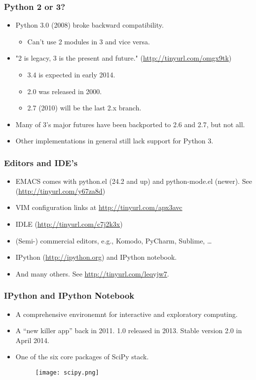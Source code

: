 \documentclass{beamer}
\begin{document}
\begin{frame}[fragile]
\frametitle{Python 2 or 3?}
\begin{itemize}

\item Python 3.0 (2008) broke backward compatibility.
\begin{itemize}
\item Can't use 2 modules in 3 and vice versa.
\end{itemize}

\item "2 is legacy, 3 is the
       present and future." (\url{http://tinyurl.com/omgx9tk})
\begin{itemize}
\item 3.4 is expected in early 2014.
\item 2.0 was released in 2000.
\item 2.7 (2010) will be the last 2.x branch.
\end{itemize}

\item Many of 3's major futures have been backported to 2.6 and 2.7, 
      but not all. 
\item Other implementations in general still
      lack support for Python 3.
\end{itemize}
\end{frame}

\begin{frame}[fragile]
\frametitle{Editors and IDE's}
\begin{itemize}
\item EMACS comes with python.el (24.2 and up) and
      python-mode.el (newer). See (\url{http://tinyurl.com/y67za8d})
\item VIM configuration links at \url{http://tinyurl.com/apx3avc}
\item IDLE (\url{http://tinyurl.com/c7j2k3x})
\item (Semi-) commercial editors, e.g., Komodo, PyCharm, Sublime, \ldots 
\item IPython (\url{http://ipython.org}) and IPython notebook.
\item And many others. See \url{http://tinyurl.com/leqyjw7}.
\end{itemize}
\end{frame}

\begin{frame}[fragile]
\frametitle{IPython and IPython Notebook}
\begin{itemize}
\item A comprehensive environemnt for interactive and exploratory
      computing.
\item A ``new killer app'' back in 2011. 1.0 released in 2013.
      Stable version 2.0 in April 2014.
\item One of the six core packages of SciPy stack.
\begin{figure}[h]
\texttt{[image: scipy.png]}
\end{figure}
\end{itemize}
\end{frame}
\end{document}
